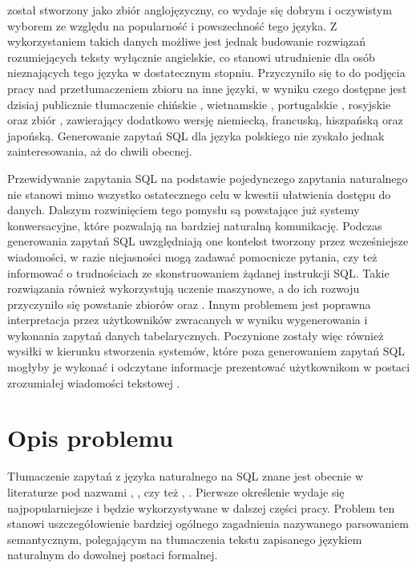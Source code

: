  został stworzony jako zbiór anglojęzyczny, co wydaje się dobrym i oczywistym wyborem ze względu na popularność i powszechność tego języka. Z wykorzystaniem takich danych możliwe jest jednak budowanie rozwiązań rozumiejących teksty wyłącznie angielskie, co stanowi utrudnienie dla osób nieznających tego języka w dostatecznym stopniu. Przyczyniło się to do podjęcia pracy nad przetłumaczeniem zbioru  na inne języki, w wyniku czego dostępne jest dzisiaj publicznie tłumaczenie chińskie , wietnamskie , portugalskie , rosyjskie  oraz zbiór  , zawierający dodatkowo wersję niemiecką, francuską, hiszpańską oraz japońską. Generowanie zapytań SQL dla języka polskiego nie zyskało jednak zainteresowania, aż do chwili obecnej.

Przewidywanie zapytania SQL na podstawie pojedynczego zapytania naturalnego nie stanowi mimo wszystko ostatecznego celu w kwestii ułatwienia dostępu do danych. Dalszym rozwinięciem tego pomysłu są powstające już systemy konwersacyjne, które pozwalają na bardziej naturalną komunikację. Podczas generowania zapytań SQL uwzględniają one kontekst tworzony przez wcześniejsze wiadomości, w razie niejasności mogą zadawać pomocnicze pytania, czy też informować o trudnościach ze skonstruowaniem żądanej instrukcji SQL. Takie rozwiązania również wykorzystują uczenie maszynowe, a do ich rozwoju przyczyniło się powstanie zbiorów   oraz  . Innym problemem jest poprawna interpretacja przez użytkowników zwracanych w wyniku wygenerowania i wykonania zapytań danych tabelarycznych. Poczynione zostały więc również wysiłki w kierunku stworzenia systemów, które poza generowaniem zapytań SQL mogłyby je wykonać i odczytane informacje prezentować użytkownikom w postaci zrozumiałej wiadomości tekstowej .

\section{Opis problemu}
Tłumaczenie zapytań z języka naturalnego na SQL znane jest obecnie w literaturze pod nazwami , , czy też , . Pierwsze określenie wydaje się najpopularniejsze i będzie wykorzystywane w dalszej części pracy. Problem ten stanowi uszczegółowienie bardziej ogólnego zagadnienia nazywanego parsowaniem semantycznym, polegającym na tłumaczenia tekstu zapisanego językiem naturalnym do dowolnej postaci formalnej.

